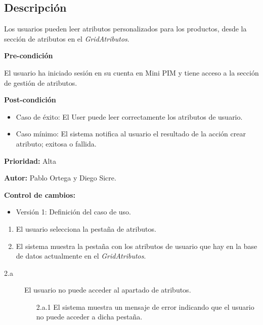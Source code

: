 
\subsection*{Descripción}
Los usuarios pueden leer atributos personalizados para los productos, desde la sección de atributos en el \textit{GridAtributos}.
\vspace{0.15cm}

\textbf{Pre-condición}\par
El usuario ha iniciado sesión en su cuenta en Mini PIM y tiene acceso a la sección de gestión de atributos.\par
\vspace{0.15cm}

\textbf{Post-condición}
\begin{itemize}
    \item Caso de éxito: El User puede leer correctamente los atributos de usuario.
    \item Caso mínimo: El sistema notifica al usuario el resultado de la acción crear atributo; exitosa o fallida.
\end{itemize}

\textbf{Prioridad: }
Alta
\vspace{0.15cm}

\textbf{Autor: }
Pablo Ortega y Diego Sicre.\par
\vspace{0.15cm}

\textbf{Control de cambios: }
\begin{itemize}
    \item Versión 1: Definición del caso de uso.
\end{itemize}

\begin{enumerate}
    \item El usuario selecciona la pestaña de atributos.
    \item El sistema muestra la pestaña con los atributos de usuario que hay en la base de datos actualmente en el \textit{GridAtributos}.
\end{enumerate}

\begin{description}
    \item[2.a] El usuario no puede acceder al apartado de atributos.
    \begin{enumerate}
        \item[2.a.1] El sistema muestra un mensaje de error indicando que el usuario no puede acceder a dicha pestaña.
    \end{enumerate}
\end{description}

